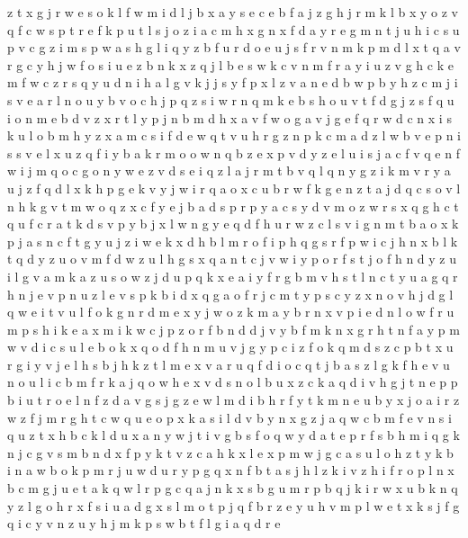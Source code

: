 \documentclass{article}
\begin{document}
z t x g j r w e s o k l f
w m i d l j b x a y s e
c e b f a j z g
h j r m k l b x y o z v q f c w s
p t
r e f k p u t l s j o z i a c m h x g n
x f d a y r e g m n t j u h i c s
u p v c g z i m
s p
w a s h g l i q y z b f u r d
o e u j s f r v n m k
p m d l x t q a v r g c y h j w f o s i u e z b n k
x z
q j l b e s w k c v n m f r a y i u z
v g h c k
e m f w c z r s q y u d n i h a l g v k j
j s y f p x l z v a n e d b
w p b y h z c m j i s v e a r l n o u
y b v o c h j p q z s i w r
n q m k e b s h o u v t f d g j z
s f q
u i o n m e b d v z x r
t l y p j n b m d h x a v f w o g
a v j g e f q r w d c n x i s k u l o b m h y z
x a m c s i f d e w q t v u h r g z n p k
c m a d z l w b v e p n i s
s v e l x u z q f i y b a k r m o
o w n q b z e x p v d
y z e l u i s j a c f v q
e n f w i j m q o c g
o n y w e z
v
d s e i q z l a j r m t b v
q l
q n y g
z i k m
v r y a u j z f q d l x k
h p g e k v y j w i r q a o x c
u b r w f k g e n z t a j d q c s o v
l n h k g v t m w o q z x c f y e j b a d s p r
p y a c s
y d v m o z w r s x q g h c t
q u f c r a t k d s v p y b j x l w n g
y e q d f h u r w z c l s v i g n m t b a o x k p j
a s n c f t g y u j z i w e k x d h b l m r o
f i p h q g
s r f p w i c j h n x b l k t q d y z u o v m
f d
w
z u l h g s x q a n t c j v w i y p o r f
s t j o f h n d y z u i l g v a m
k a
z u s
o w z j d u p q k x e a i y f r g b m v h s t l n c
t y u a g q r h n j e v p
n u z l e v s p k b i d x q g a o f r j c m t y
p s c y z x n o v h j d g l q w e
i t v u l f o k g n r d m e x y j w
o z k m a y b r n x v p i e d
n l o w f r u m p s h i k e a
x m i k w c j p z o r f b n d
d j v y b f m k n x g
r h t n f a y p m w v d i c s u l e b o k x q
o d f h n m u v j g y p c i z
f o k q m d s z c p b t x u r g i y v j e l h
s b j h k z t l m e x v a r u q f d i o
c q t j b a s z l g k f h e v u n o
u l i c b m f r k a j q o w h e x v d s n
o l b u x z c k a q d i v h g j t n e p
p b i u t r o e l n f z d a v g s j
g z e w l m d i b h r f y t k
m n e u b y x j o a i r z w
z f j m r g h t c w q u e o p x k a s i l d v b y n
x g z j a q w c b m f e v n s i
q u z t x h b c k l d
u x a n y w j t i v g b s f o q
w y d a t e p r f s b h m i q g k n j
c g v
s m b n d x f p y k t v z c a h
k x l
e x p m w j g c a s u l o h z t y k b i
n a w b o k p m r j u
w d u r y p g q x n f b t a s j h l z k i v
z h i f r o p l n x b c m g j u e t a k q w
l r p g c q a j n k
x s b g u m r p
b q j k i r w x u
b k n q y z l g o h r x f s
i u a d g x s l m o t p j q f b r z e y
u h v m p l w e t x k s j f g q i c y
v n z u y h j m k p s w b t f l g i a q d r e
\end{document}
